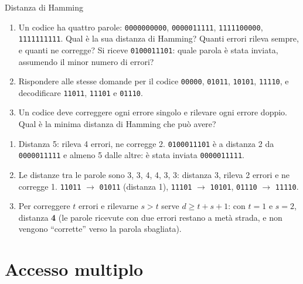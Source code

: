 \begin{esercizio}{Distanza di Hamming}
\begin{enumerate}[label=(\alph*)]
    \item Un codice ha quattro parole: \texttt{0000000000}, \texttt{0000011111}, \texttt{1111100000}, \texttt{1111111111}. Qual è la sua
          distanza di Hamming? Quanti errori rileva sempre, e quanti ne corregge? Si riceve \texttt{0100011101}: quale parola è stata
          inviata, assumendo il minor numero di errori?
    \item Rispondere alle stesse domande per il codice \texttt{00000}, \texttt{01011}, \texttt{10101}, \texttt{11110}, e decodificare
          \texttt{11011}, \texttt{11101} e \texttt{01110}.
    \item Un codice deve correggere ogni errore singolo e rilevare ogni errore doppio. Qual è la minima distanza di Hamming che può avere?
\end{enumerate}

\svolgimento
\begin{enumerate}[label=(\alph*)]
    \item Distanza 5: rileva 4 errori, ne corregge 2. \texttt{0100011101} è a distanza 2 da \texttt{0000011111} e almeno 5 dalle altre:
          è stata inviata \texttt{0000011111}.
    \item Le distanze tra le parole sono 3, 3, 4, 4, 3, 3: distanza 3, rileva 2 errori e ne corregge 1. \texttt{11011} $\rightarrow$
          \texttt{01011} (distanza 1), \texttt{11101} $\rightarrow$ \texttt{10101}, \texttt{01110} $\rightarrow$ \texttt{11110}.
    \item Per correggere $t$ errori e rilevarne $s > t$ serve $d \geq t + s + 1$: con $t = 1$ e $s = 2$, distanza \textbf{4} (le parole
          ricevute con due errori restano a metà strada, e non vengono ``corrette'' verso la parola sbagliata).
\end{enumerate}
\end{esercizio}

\section{Accesso multiplo}

